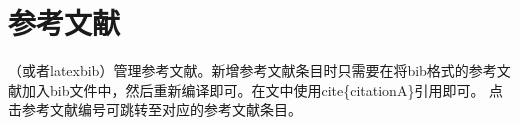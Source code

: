 \pagebreak
\section{参考文献}
（或者latexbib）管理参考文献。新增参考文献条目时只需要在将bib格式的参考文献加入bib文件中，然后重新编译即可。在文中使用cite\{citationA\}引用即可。
点击参考文献编号\cite{shen2017deepskeleton}可跳转至对应的参考文献条目。